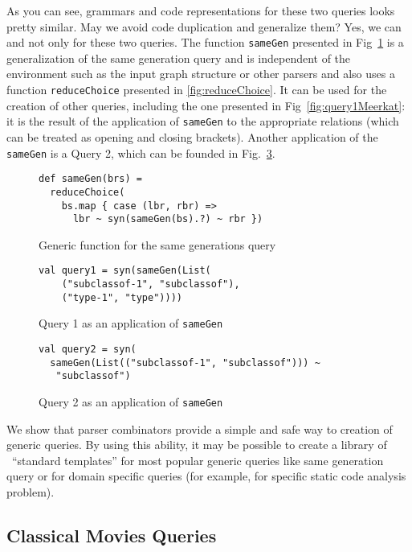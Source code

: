 As you can see, grammars and code representations for these two queries looks pretty similar.
May we avoid code duplication and generalize them?
Yes, we can and not only for these two queries.
The function \lstinline{sameGen} presented in Fig~\ref{fig:gen} is a generalization of the same generation query and is independent of the environment such as the input graph structure or other parsers and also uses a function \lstinline{reduceChoice} presented in \ref{fig:reduceChoice}.
It can be used for the creation of other queries, including the one presented in Fig~\ref{fig:query1Meerkat}: it is the result of the application of \lstinline{sameGen} to the appropriate relations (which can be treated as opening and closing brackets).
Another application of the \lstinline{sameGen} is a Query 2, which can be founded in Fig.~\ref{fig:query2Gen}.


\begin{figure}[h]
\begin{lstlisting}
def sameGen(brs) =
  reduceChoice(
    bs.map { case (lbr, rbr) =>
      lbr ~ syn(sameGen(bs).?) ~ rbr })
\end{lstlisting}
\caption{Generic function for the same generations query}
\label{fig:gen}
\end{figure}


\begin{figure}[h]
\begin{lstlisting}
val query1 = syn(sameGen(List(
    ("subclassof-1", "subclassof"),
    ("type-1", "type"))))
\end{lstlisting}
\caption{Query 1 as an application of \lstinline{sameGen}}
\label{fig:query1Gen}
\end{figure}


\begin{figure}[h]
\begin{lstlisting}
val query2 = syn(
  sameGen(List(("subclassof-1", "subclassof"))) ~
   "subclassof")
\end{lstlisting}
\caption{Query 2 as an application of \lstinline{sameGen}}
\label{fig:query2Gen}
\end{figure}


We show that parser combinators provide a simple and safe way to creation of generic queries.
By using this ability, it may be possible to create a library of \ ``standard templates'' for most popular generic queries like same generation query or for domain specific queries (for example, for specific static code analysis problem).


\subsection{Classical Movies Queries}

